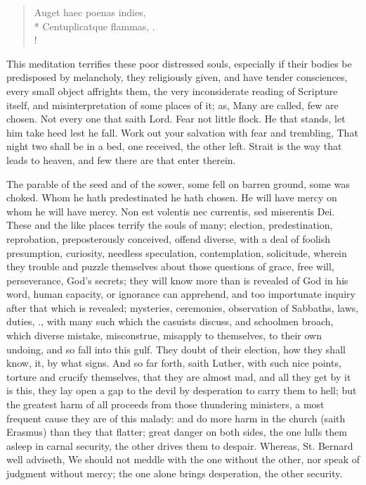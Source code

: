 {\begin{latin}
\begin{verse}
Auget haec poenas indies,\\*
Centuplicatque flammas, \etc{}.\\!
\end{verse}
\end{latin}

This meditation terrifies these poor distressed souls, especially if
their bodies be predisposed by melancholy, they religiously given, and
have tender consciences, every small object affrights them, the very
inconsiderate reading of Scripture itself, and misinterpretation of
some places of it; as, Many are called, few are chosen. Not every one
that saith Lord. Fear not little flock. He that stands, let him take
heed lest he fall. Work out your salvation with fear and trembling,
That night two shall be in a bed, one received, the other left. Strait
is the way that leads to heaven, and few there are that enter therein.

The parable of the seed and of the sower, some fell on barren ground,
some was choked. Whom he hath predestinated he hath chosen. He will
have mercy on whom he will have mercy. Non est volentis nec currentis,
sed miserentis Dei. These and the like places terrify the souls of
many; election, predestination, reprobation, preposterously conceived,
offend diverse, with a deal of foolish presumption, curiosity, needless
speculation, contemplation, solicitude, wherein they trouble and puzzle
themselves about those questions of grace, free will, perseverance,
God's secrets; they will know more than is revealed of God in his word,
human capacity, or ignorance can apprehend, and too importunate inquiry
after that which is revealed; mysteries, ceremonies, observation of
Sabbaths, laws, duties, \etc{}., with many such which the casuists discuss,
and schoolmen broach, which diverse mistake, misconstrue, misapply to
themselves, to their own undoing, and so fall into this gulf. They
doubt of their election, how they shall know, it, by what signs. And so
far forth, saith Luther, with such nice points, torture and crucify
themselves, that they are almost mad, and all they get by it is this,
they lay open a gap to the devil by desperation to carry them to hell;
but the greatest harm of all proceeds from those thundering ministers,
a most frequent cause they are of this malady: and do more harm
in the church (saith Erasmus) than they that flatter; great danger on
both sides, the one lulls them asleep in carnal security, the other
drives them to despair. Whereas, St. Bernard well adviseth, We
should not meddle with the one without the other, nor speak of judgment
without mercy; the one alone brings desperation, the other security.

}
